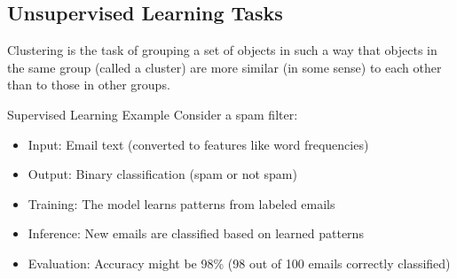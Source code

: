 \subsection{Unsupervised Learning Tasks}

\begin{definition}{Clustering}
    is the task of grouping a set of objects in such a way that objects in the same group (called a cluster) are more similar (in some sense) to each other than to
    those in other groups.
\end{definition}

\begin{example2}{Supervised Learning Example}
Consider a spam filter:
\begin{itemize}
    \item Input: Email text (converted to features like word frequencies)
    \item Output: Binary classification (spam or not spam)
    \item Training: The model learns patterns from labeled emails
    \item Inference: New emails are classified based on learned patterns
    \item Evaluation: Accuracy might be 98\% (98 out of 100 emails correctly classified)
\end{itemize}
\end{example2}


